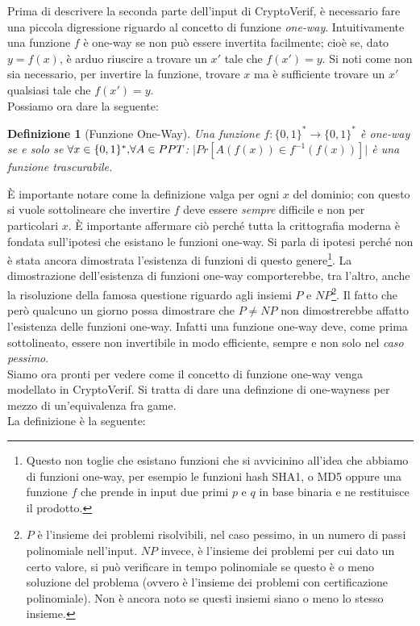 \documentclass[a4paper,openright,twoside,12pt]{report}
\newtheorem{definizione}{Definizione}[chapter]
\begin{document}
Prima di descrivere la seconda parte dell'input di CryptoVerif, \`e necessario fare una piccola digressione riguardo al concetto di funzione \emph{one-way}.
Intuitivamente una funzione $f$ \`e one-way se non pu\`o essere invertita facilmente; cio\`e se, dato $y=f(x)$, \`e arduo riuscire a trovare un $x'$ tale che $f(x')=y$. 
Si noti come non sia necessario, per invertire la funzione, trovare $x$ ma \`e sufficiente trovare un $x'$ qualsiasi tale che $f(x')=y$.
\\Possiamo ora dare la seguente:
\begin{definizione}[Funzione One-Way]
Una funzione $f: \{0,1\}^*\rightarrow \{0,1\}^*$ \`e one-way se e solo se $\forall x \in  \{0,1\}^* \hbox{,} \forall A \in PPT$:  $\lvert Pr[A(f(x)) \in f^{-1}(f(x))]\rvert$ \`e una funzione 
trascurabile.
\end{definizione}

\`E importante notare come la definizione valga per ogni $x$ del dominio; con questo si vuole sottolineare che invertire $f$ deve essere \emph{sempre} difficile e non per particolari $x$.
\`E importante affermare ci\`o perch\'e tutta la crittografia moderna \`e fondata sull'ipotesi che esistano le funzioni one-way.
Si parla di ipotesi perch\'e non \`e stata ancora dimostrata l'esistenza di funzioni di questo genere\footnote{Questo non toglie
che esistano funzioni che si avvicinino all'idea che abbiamo di funzioni one-way, per esempio le funzioni hash SHA1, o MD5 oppure una funzione
$f$ che prende in input due primi $p$ e $q$ in base binaria e ne restituisce il prodotto.}.
La dimostrazione dell'esistenza di funzioni one-way comporterebbe, tra l'altro, anche la risoluzione della famosa questione riguardo agli insiemi
$P$ e $NP$\footnote{$P$ \`e l'insieme dei problemi risolvibili, nel caso pessimo, in un numero di passi polinomiale nell'input. $NP$ invece, \`e l'insieme dei problemi per cui dato un certo valore, 
si pu\`o verificare in tempo polinomiale se questo \`e o meno soluzione del problema (ovvero \`e l'insieme dei problemi con certificazione polinomiale). 
Non \`e ancora noto se questi insiemi siano o meno lo stesso insieme.}.
Il fatto che però qualcuno un giorno possa dimostrare che $P \neq NP$ non dimostrerebbe affatto l'esistenza delle funzioni one-way. 
Infatti una funzione one-way deve, come prima sottolineato, essere non invertibile in modo efficiente, sempre e non solo nel \emph{caso pessimo}. \\ 
Siamo ora pronti per vedere come il concetto di funzione one-way venga modellato in CryptoVerif.
Si tratta di dare una definzione di one-wayness per mezzo di un'equivalenza fra game.\\La definizione \`e la seguente:
\end{document}
